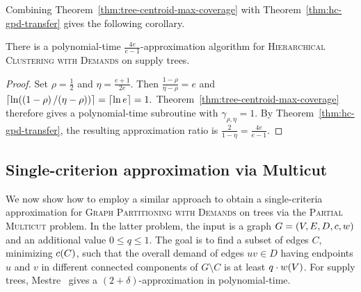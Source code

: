 Combining Theorem~\ref{thm:tree-centroid-max-coverage} with Theorem~\ref{thm:hc-gpd-transfer} gives the following corollary.
\begin{corollary}\label{cor:tree-hc-improved}
    There is a polynomial-time $\frac{4e}{e-1}$-approximation algorithm for \textsc{Hierarchical Clustering with Demands} on supply trees.
\end{corollary}
\begin{proof}
    Set $\rho=\frac12$ and $\eta=\frac{e+1}{2e}$. Then $
        \frac{1-\rho}{\eta-\rho}=e$ and $
        \mathopen{}\left\lceil \ln\mathopen{}\left( \mathopen{}\left( 1-\rho \right)/\mathopen{}\left( \eta-\rho \right) \right) \right\rceil
        =\left\lceil\ln e\right\rceil=1.$
    Theorem~\ref{thm:tree-centroid-max-coverage} therefore gives a polynomial-time subroutine with $\gamma_{\rho, \eta}=1$. By Theorem~\ref{thm:hc-gpd-transfer}, the resulting approximation ratio is $
        \frac{2}{1-\eta}=\frac{4e}{e-1}.$
\end{proof}

\subsection{Single-criterion approximation via Multicut}
\label{sec:Single-Criteria-Approximation-via-Multicut}

We now show how to employ a similar approach to obtain a single-criteria approximation for \textsc{Graph Partitioning with Demands} on trees via the \textsc{Partial Multicut} problem. 
In the latter problem, the input is a graph $G=\mathopen{}\left( V, E, D, c, w \right)$ and an additional value $0\leq q\leq 1$. The goal is to find a subset of edges $C$, minimizing $c\mathopen{}\left( C \right)$, such that the overall demand of edges $uv\in D$ having endpoints $u$ and $v$ in different connected components of $G\setminus C$ is at least $q\cdot w\mathopen{}\left( V \right)$. For supply trees, Mestre~\cite{DBLP:conf/stacs/Mestre08} gives a $(2+\delta)$-approximation in polynomial-time. 

